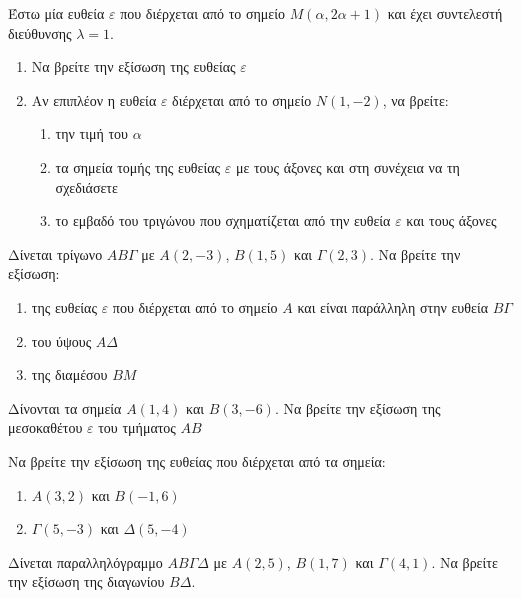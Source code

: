 \documentclass{presentation}
\begin{document}
\begin{askisi}
  Έστω μία ευθεία $ε$ που διέρχεται από το σημείο $Μ(α,2α+1)$ και έχει συντελεστή διεύθυνσης $λ=1$.
  \begin{enumerate}[<+->]
    \item Να βρείτε την εξίσωση της ευθείας $ε$
    \item Αν επιπλέον η ευθεία $ε$ διέρχεται από το σημείο $Ν(1,-2)$, να βρείτε:
          \begin{enumerate}[<+(-1)->]
            \item την τιμή του $α$
            \item τα σημεία τομής της ευθείας $ε$ με τους άξονες και στη συνέχεια να τη σχεδιάσετε
            \item το εμβαδό του τριγώνου που σχηματίζεται από την ευθεία $ε$ και τους άξονες
          \end{enumerate}
  \end{enumerate}
\end{askisi}

\begin{askisi}
  Δίνεται τρίγωνο $ΑΒΓ$ με $Α(2,-3)$, $Β(1,5)$ και $Γ(2,3)$. Να βρείτε την εξίσωση:
  \begin{enumerate}[<+->]
    \item της ευθείας $ε$ που διέρχεται από το σημείο $Α$ και είναι παράλληλη στην ευθεία $ΒΓ$
    \item του ύψους $ΑΔ$
    \item της διαμέσου $ΒΜ$
  \end{enumerate}
\end{askisi}

\begin{askisi}
  Δίνονται τα σημεία $Α(1,4)$ και $Β(3,-6)$. Να βρείτε την εξίσωση της μεσοκαθέτου $ε$ του τμήματος $ΑΒ$
\end{askisi}

\begin{askisi}
  Να βρείτε την εξίσωση της ευθείας που διέρχεται από τα σημεία:
  \begin{enumerate}[<+->]
    \item $Α(3,2)$ και $Β(-1,6)$
    \item $Γ(5,-3)$ και $Δ(5,-4)$
  \end{enumerate}
\end{askisi}

\begin{askisi}
  Δίνεται παραλληλόγραμμο $ΑΒΓΔ$ με $Α(2,5)$, $Β(1,7)$ και $Γ(4,1)$. Να βρείτε την εξίσωση της διαγωνίου $ΒΔ$.
\end{askisi}
\end{document}
